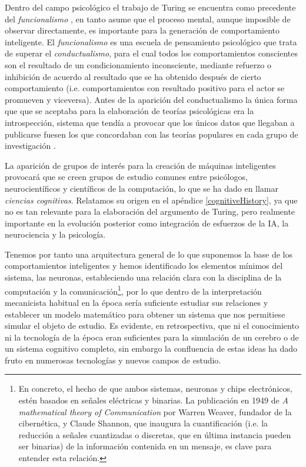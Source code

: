 \documentclass[12pt]{memoir}
\begin{document}
Dentro del campo psicológico el trabajo de Turing se encuentra como precedente del \textit{funcionalismo} \parencite{sep-functionalism}, en tanto asume que el proceso mental, aunque imposible de observar directamente, es importante para la generación de comportamiento inteligente. El \textit{funcionalismo} es una escuela de pensamiento psicológico que trata de superar el \textit{conductualismo}, para el cual todos los comportamientos conscientes son el resultado de un condicionamiento inconsciente, mediante refuerzo o inhibición de acuerdo al resultado que se ha obtenido después de cierto comportamiento (i.e. comportamientos con resultado positivo para el actor se promueven y viceversa). Antes de la aparición del conductualismo la única forma que que se aceptaba para la elaboración de teorías psicológicas era la introspección, sistema que tendía a provocar que los únicos datos que llegaban a publicarse fuesen los que concordaban con las teorías populares en cada grupo de investigación \parencite[p.13]{modernAI}.

La aparición de grupos de interés para la creación de máquinas inteligentes provocará que se creen grupos de estudio comunes entre psicólogos, neurocientíficos y científicos de la computación, lo que se ha dado en llamar \textit{ciencias cognitivas}. Relatamos su origen en el apéndice \ref{cognitiveHistory}, ya que no es tan relevante para la elaboración del argumento de Turing, pero realmente importante en la evolución posterior como integración de esfuerzos de la IA, la neurociencia y la psicología.

Tenemos por tanto una arquitectura general de lo que suponemos la base de los comportamientos inteligentes y hemos identificado los elementos mínimos del sistema, las neuronas, estableciendo una relación clara con la disciplina de la computación y la comunicación\footnote{En concreto, el hecho de que ambos sistemas, neuronas y chips electrónicos, estén basados en señales eléctricas y binarias. La publicación en 1949 de \textit{A mathematical theory of Communication} por Warren Weaver, fundador de la cibernética, y Claude Shannon, que inaugura la cuantificación (i.e. la reducción a señales cuantizadas o discretas, que en última instancia pueden ser binarias) de la información contenida en un mensaje, es clave para entender esta relación.}, por lo que dentro de la interpretación mecanicista habitual en la época sería suficiente estudiar sus relaciones y establecer un modelo matemático para obtener un sistema que nos permitiese simular el objeto de estudio. Es evidente, en retrospectiva, que ni el conocimiento ni la tecnología de la época eran suficientes para la simulación de un cerebro o de un sistema cognitivo completo, sin embargo la confluencia de estas ideas ha dado fruto en numerosas tecnologías y nuevos campos de estudio.
\end{document}
